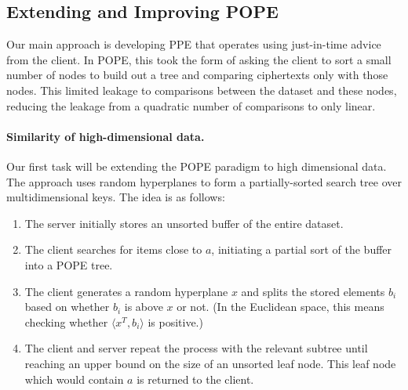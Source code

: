 

\subsection{Extending and Improving POPE}
Our main approach is developing PPE that operates using just-in-time
advice from the client.  In POPE, this took the form of asking the client to
sort a small number of nodes to build out a tree and comparing ciphertexts only
with those nodes.  This limited leakage to comparisons between the dataset and
these nodes, reducing the leakage from a quadratic number of
comparisons to only linear.

\paragraph{Similarity of high-dimensional data.}
Our first task will be extending the POPE
paradigm to high dimensional data.  The approach uses random hyperplanes
\cite{STOC:DasFre08,charikar2002similarity}
to form a partially-sorted search tree over multidimensional keys.
The idea is as follows:

\begin{enumerate}\setlength\itemsep{0em}
\item The server initially stores an unsorted buffer of the entire dataset.
\item The client searches for items close to $a$,
  initiating a partial sort of the buffer into a POPE tree.
\item The client generates a random hyperplane $x$ and splits 
  the stored elements $b_i$ based on whether $b_i$ is above $x$ or not.  (In
    the Euclidean space, this means checking whether $\langle x^T,b_i \rangle$
    is positive.)
\item The client and server repeat the process with the relevant subtree
  until reaching an upper bound on the size of an unsorted leaf node.
  This leaf node which would contain $a$ is returned to the client.
\end{enumerate}

